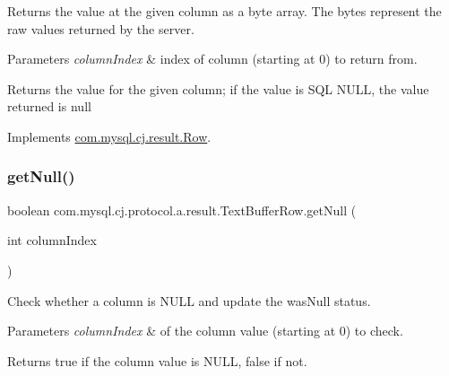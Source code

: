 Returns the value at the given column as a byte array. The bytes represent the raw values returned by the server.


\begin{DoxyParams}{Parameters}
{\em column\+Index} & index of column (starting at 0) to return from. \\
\hline
\end{DoxyParams}
\begin{DoxyReturn}{Returns}
the value for the given column; if the value is S\+QL {\ttfamily N\+U\+LL}, the value returned is {\ttfamily null} 
\end{DoxyReturn}


Implements \mbox{\hyperlink{interfacecom_1_1mysql_1_1cj_1_1result_1_1_row_a063918cd10fe7c3ef5df95b33e21f19e}{com.\+mysql.\+cj.\+result.\+Row}}.

\mbox{\label{classcom_1_1mysql_1_1cj_1_1protocol_1_1a_1_1result_1_1_text_buffer_row_a7539d7bd87e15e6e315e67f7cc535aa6}} 
\subsubsection{\texorpdfstring{get\+Null()}{getNull()}}
{\footnotesize\ttfamily boolean com.\+mysql.\+cj.\+protocol.\+a.\+result.\+Text\+Buffer\+Row.\+get\+Null (\begin{DoxyParamCaption}\item[{int}]{column\+Index }\end{DoxyParamCaption})}

Check whether a column is N\+U\+LL and update the \textquotesingle{}was\+Null\textquotesingle{} status.


\begin{DoxyParams}{Parameters}
{\em column\+Index} & of the column value (starting at 0) to check.\\
\hline
\end{DoxyParams}
\begin{DoxyReturn}{Returns}
true if the column value is N\+U\+LL, false if not. 
\end{DoxyReturn}


